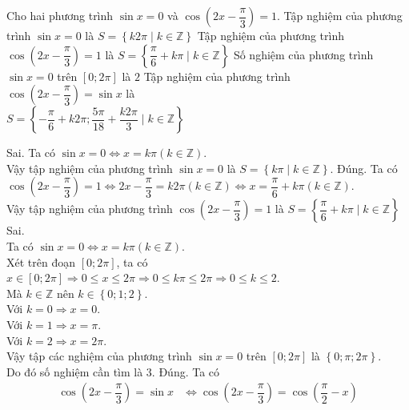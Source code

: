 \begin{ex}%
Cho hai phương trình $\sin x=0$ và $\cos \left(2x-\dfrac{\pi}{3}\right)=1$.
	\choiceTF
	{Tập nghiệm của phương trình $\sin x=0$ là $S=\left\{k2\pi \mid k \in \mathbb{Z}\right\}$}
	{\True Tập nghiệm của phương trình $\cos \left(2x-\dfrac{\pi}{3}\right)=1$ là $S=\left\{\dfrac{\pi}{6}+k\pi \mid k \in \mathbb{Z}\right\}$}
	{Số nghiệm của phương trình $\sin x=0$ trên $[0;2\pi]$ là $2$}
	{\True Tập nghiệm của phương trình $\cos \left(2x-\dfrac{\pi}{3}\right)=\sin x$ là\\ $S=\left\{-\dfrac{\pi}{6}+k2\pi; \dfrac{5 \pi}{18}+\dfrac{k 2 \pi}{3} \mid k \in \mathbb{Z}\right\}$}
	\loigiai
	{
		\begin{itemchoice}
			\itemch Sai. Ta có
			$\sin x = 0 \Leftrightarrow x = k \pi (k \in \mathbb{Z})$.\\
			Vậy tập nghiệm của phương trình $\sin x=0$ là $S=\left\{k\pi \mid k \in \mathbb{Z}\right\}$.
			\itemch Đúng. Ta có\\
			$\cos \left(2x-\dfrac{\pi}{3}\right)=1 \Leftrightarrow 2x-\dfrac{\pi}{3}= k2 \pi (k \in \mathbb{Z}) \Leftrightarrow x = \dfrac{\pi}{6}+k \pi (k \in \mathbb{Z}).$\\
			Vậy tập nghiệm của phương trình $\cos \left(2x-\dfrac{\pi}{3}\right)=1$ là $S=\left\{\dfrac{\pi}{6}+k\pi \mid k \in \mathbb{Z}\right\}$
			\itemch Sai.\\
			Ta có $\sin x =0 \Leftrightarrow x = k \pi (k \in \mathbb{Z})$.\\
			Xét trên đoạn $[0;2\pi]$, ta có\\
			$x \in [0;2\pi] \Rightarrow 0 \le x \le 2 \pi \Rightarrow 0 \le k \pi \le 2 \pi \Rightarrow 0 \le k \le 2$.\\
			Mà $k \in \mathbb{Z}$ nên $k \in \left\{0;1;2\right\}$.\\
			Với $k=0 \Rightarrow x =0$.\\
			Với $k=1 \Rightarrow x = \pi$.\\
			Với $k=2 \Rightarrow x=2 \pi$.\\
			Vậy tập các nghiệm của phương trình $\sin x=0$ trên $[0;2\pi]$ là $\left\{0;\pi;2\pi\right\}$.\\
			Do đó số nghiệm cần tìm là $3$.
			\itemch Đúng. Ta có
			\allowdisplaybreaks
			\begin{align*}
				\cos \left(2x-\dfrac{\pi}{3}\right)=\sin x &\Leftrightarrow 	\cos \left(2x-\dfrac{\pi}{3}\right)=\cos \left(\dfrac{\pi}{2}-x\right) \\

\end{align*}
\end{itemchoice}}
\end{ex}
